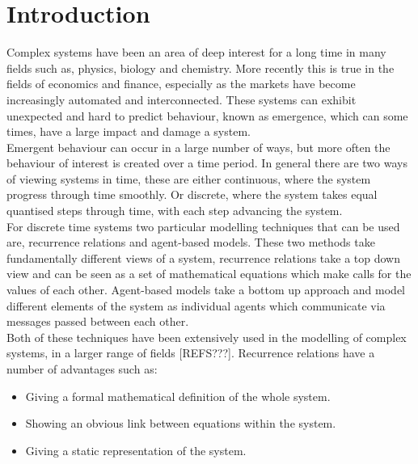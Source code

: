 \documentclass{article}
\begin{document}



\section{Introduction}
Complex systems have been an area of deep interest for a long time in many  fields such as, physics, biology and chemistry. More recently this is true in the fields of economics and finance, especially as the markets have become increasingly automated and interconnected. These systems can exhibit unexpected and hard to predict behaviour, known as emergence, which can some times, have a large impact and damage a system.\\ 
Emergent behaviour can occur in a large number of ways, but more often the behaviour of interest is created over a time period. In general there are two ways of viewing systems in time, these are either continuous, where the system progress through time smoothly. Or discrete, where the system takes equal quantised steps through time, with each step advancing the system.\\
For discrete time systems two particular modelling techniques that can be used are, recurrence relations and agent-based models. These two methods take fundamentally different views of a system, recurrence relations take a top down view and can be seen as a set of mathematical equations which make calls for the values of each other. Agent-based models take a bottom up approach and model different elements of the system as individual agents which communicate via messages passed between each other.\\
Both of these techniques have been extensively used in the modelling of complex systems, in a larger range of fields [REFS???]. %
Recurrence relations have a number of advantages such as:
\begin{itemize}
  \item Giving a formal mathematical definition of the whole system.
  \item Showing an obvious link between equations within the system. 
  \item Giving a static representation of the system.  
\end{itemize}
\end{document}
